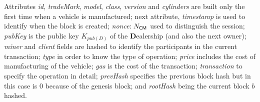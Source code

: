 Attributes \textit{id}, \textit{tradeMark}, \textit{model}, \textit{class}, 
\textit{version} and \textit{cylinders} are built only the first time when 
a vehicle is manufactured; 
next attribute, \textit{timestamp} is used to identify when the block is created; 
\textit{nonce}$:N_{\textsf{C}\textsf{M}}$ used to distinguish the session; 
\textit{pubKey} is the public key $K_{pub(D)}$ of the \textbf{D}ealership (and also the next owner); 
\textit{miner} and \textit{client} fields are hashed to identify the participants in the current 
transaction; 
\textit{type} in order to know the type of operation; 
\textit{price} includes the cost of manufacturing of the vehicle;
\textit{gas} is the cost of the transaction;
\textit{transaction} to specify the operation in detail; \textit{prevHash} specifies the previous
block hash but in this case is 0 because of the genesis block; and \textit{rootHash} being the current 
block $b$ hashed.